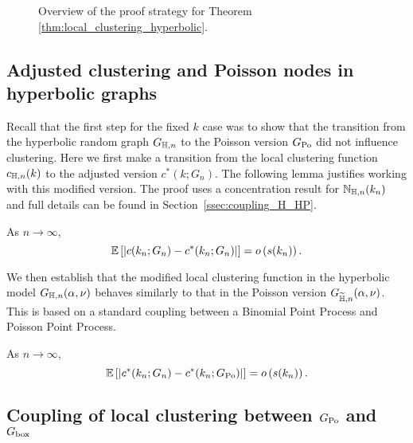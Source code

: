 \begin{figure}[!t]

\caption{Overview of the proof strategy for Theorem \ref{thm:local_clustering_hyperbolic}.}
\label{fig:overview_proof}
\end{figure}


\subsection{Adjusted clustering and Poisson nodes in hyperbolic graphs}

Recall that the first step for the fixed $k$ case was to show that the transition from the hyperbolic random graph $G_{\mathbb{H},n}$ to the Poisson version $G_{\text{Po}}$ did not influence clustering. Here we first make a transition from the local clustering function $c_{\mathbb{H},n}(k)$ to the adjusted version $c^\ast(k; G_n)$. The following lemma justifies working with this modified version. The proof uses a concentration result for $\mathbb{N}_{\mathbb{H},n}(k_n)$ and full details can be found in Section~\ref{ssec:coupling_H_HP}.

\begin{lemma}\label{lem:clustering_ast_H}
As $n \to \infty$,
\[
	\mathbb{E}\left[\left|c(k_n;G_n) - c^\ast(k_n;G_n)\right|\right] = o\left(s(k_n)\right).
\]
\end{lemma}

We then establish that the modified local clustering function in the hyperbolic model $G_{\mathbb{H},n}(\alpha,\nu)$ behaves similarly to that in the Poisson version $G_{\widetilde{\mathbb{H}}, n}(\alpha,\nu)$. This is based on a standard coupling between a Binomial Point Process and Poisson Point Process.

\begin{proposition}\label{prop:clustering_ast_H_Pois}
As $n \to \infty$,
\[
	\mathbb{E}\left[\left|c^\ast(k_n;G_n) - c^\ast(k_n; G_{\text{Po}})\right|\right] = o\left(s(k_n)\right).
\]
\end{proposition}

\subsection{Coupling of local clustering between $G_{\text{Po}}$ and $G_{\text{box}}$}

